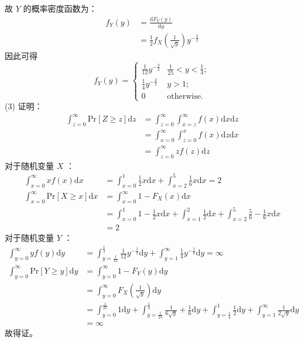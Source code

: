 \documentclass{article}
\begin{document}
		故 $Y$ 的概率密度函数为：
		\begin{equation}
		\begin{aligned}
		f_Y(y)
		&= \frac{\mathrm{d}F_Y(y)}{\mathrm{d}y} \\
		&= \frac{1}{2} f_X(\frac{1}{\sqrt{y}})y^{-\frac{3}{2}}
		\end{aligned}
		\end{equation}
		因此可得
		\begin{equation}
		f_Y(y)=\begin{cases}
		\frac{1}{12}y^{-\frac{3}{2}} & \frac{1}{25}<y<\frac{1}{4};\\
		\frac{1}{4}y^{-\frac{3}{2}} & y>1;\\
		0 & \text{otherwise}.
		\end{cases}
		\end{equation}
	(3) 证明： 
		\begin{equation}
		\begin{aligned}
		\int^\infty_{z=0} \mathrm{Pr}[Z\geq z]\mathrm{d}z
		&= \int^\infty_{z=0} \int^\infty_{x=z}f(x)\mathrm{d}x\mathrm{d}z \\
		&= \int^\infty_{x=0} \int^x_{z=0}f(x)\mathrm{d}z\mathrm{d}x \\
		&= \int^\infty_{z=0} zf(z)\mathrm{d}z
		\end{aligned}
		\end{equation}
		对于随机变量 $X$ ：
		\begin{equation}
		\begin{aligned}
		\int^\infty_{x=0} x f(x)\mathrm{d}x
		&=\int^1_{x=0} \frac{1}{2}x\mathrm{d}x + \int^5_{x=2} \frac{1}{6}x\mathrm{d}x = 2 \\
		\int^\infty_{x=0} \mathrm{Pr}[X\geq x]\mathrm{d}x
		&=\int^\infty_{x=0} 1-F_X(x)\mathrm{d}x \\
		&=\int^1_{x=0} 1-\frac{1}{2}x\mathrm{d}x + \int^2_{x=1} \frac{1}{2}\mathrm{d}x + \int^5_{x=2} \frac{5}{6}-\frac{1}{6}x \mathrm{d}x \\
		&=2
		\end{aligned}
		\end{equation}
		对于随机变量 $Y$ ：
		\begin{equation}
		\begin{aligned}
		\int^\infty_{y=0} y f(y)\mathrm{d}y
		&=\int^{\frac{1}{4}}_{y=\frac{1}{25}} \frac{1}{12}y^{-\frac{1}{2}}\mathrm{d}y + \int^\infty_{y=1} \frac{1}{4}y^{-\frac{1}{2}}\mathrm{d}y = \infty \\
		\int^\infty_{y=0} \mathrm{Pr}[Y\geq y]\mathrm{d}y
		&=\int^\infty_{y=0} 1-F_Y(y)\mathrm{d}y \\
		&=\int^\infty_{y=0} F_X(\frac{1}{\sqrt{y}})\mathrm{d}y \\
		&=\int^\frac{1}{25}_{y=0} 1\mathrm{d}y + \int^\frac{1}{4}_{y=\frac{1}{25}} \frac{1}{6\sqrt{y}} + \frac{1}{6}\mathrm{d}y + \int^1_{y=\frac{1}{4}} \frac{1}{2}\mathrm{d}y + \int^\infty_{y=1} \frac{1}{2\sqrt{y}} \mathrm{d}y \\
		&=\infty
		\end{aligned}
		\end{equation}
		故得证。
	
\end{document}
